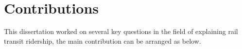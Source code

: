 \section{Contributions}

This dissertation worked on several key questions in the field of explaining rail transit ridership, the main contribution can be arranged as below.

